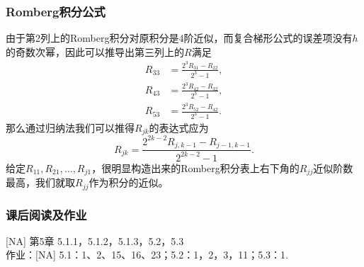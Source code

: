 \documentclass[10pt]{beamer}
\begin{document}
\begin{frame}
\frametitle{Romberg积分公式}
由于第2列上的Romberg积分对原积分是$4$阶近似，而复合梯形公式的误差项没有$h$的奇数次幂，因此可以推导出第三列上的$R$满足
\begin{align}
R_{33} &= \frac{2^3 R_{31} - R_{22}}{2^3-1}, \nonumber \\
R_{43} &= \frac{2^3 R_{42} - R_{32}}{2^3-1}, \nonumber \\
R_{53} &= \frac{2^3 R_{52} - R_{42}}{2^3-1}.
\end{align}
那么通过归纳法我们可以推得$R_{jk}$的表达式应为
\begin{equation}
R_{jk} = \frac{2^{2k-2} R_{j,k-1} - R_{j-1, k-1}}{2^{2k-2} - 1}.
\end{equation}
给定$R_{11}, R_{21}, \ldots, R_{j1}$，很明显构造出来的Romberg积分表上右下角的$R_{jj}$近似阶数最高，我们就取$R_{jj}$作为积分的近似。
\end{frame}



\begin{frame}
\frametitle{课后阅读及作业}
[NA] 第5章 5.1.1，5.1.2，5.1.3，5.2，5.3\\
作业：[NA] 5.1：1、2、15、16、23；5.2：1，2，3，11；5.3：1.


\end{frame}
\end{document}
